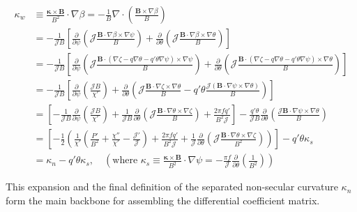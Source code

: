 \documentclass[11pt,a4paper]{article}
\begin{document}
\[ \begin{aligned} 
\kappa_w &\equiv \frac{\boldsymbol{\kappa} \times \mathbf{B}}{B^2} \cdot \nabla\beta = -\frac{1}{B} \nabla \cdot \left( \frac{\mathbf{B} \times \nabla\beta}{B} \right) \\ 
&= -\frac{1}{\mathcal{J} B} \left[ \frac{\partial}{\partial\psi} \left( \mathcal{J} \frac{\mathbf{B} \cdot \nabla\beta \times \nabla\psi}{B} \right) + \frac{\partial}{\partial\theta} \left( \mathcal{J} \frac{\mathbf{B} \cdot \nabla\beta \times \nabla\theta}{B} \right) \right] \\ 
&= -\frac{1}{\mathcal{J} B} \left[ \frac{\partial}{\partial\psi} \left( \mathcal{J} \frac{\mathbf{B} \cdot (\nabla\zeta - q\nabla\theta - q'\theta\nabla\psi) \times \nabla\psi}{B} \right) + \frac{\partial}{\partial\theta} \left( \mathcal{J} \frac{\mathbf{B} \cdot (\nabla\zeta - q\nabla\theta - q'\theta\nabla\psi) \times \nabla\theta}{B} \right) \right] \\ 
&= -\frac{1}{\mathcal{J} B} \left[ \frac{\partial}{\partial\psi} \left( \frac{\mathcal{J} B}{\chi'} \right) + \frac{\partial}{\partial\theta} \left( \mathcal{J} \frac{\mathbf{B} \cdot \nabla\zeta \times \nabla\theta}{B} - q'\theta \frac{\mathcal{J} (\mathbf{B} \cdot \nabla\psi \times \nabla\theta)}{B} \right) \right] \\ 
&= \left[-\frac{1}{\mathcal{J} B} \frac{\partial}{\partial\psi} \left( \frac{\mathcal{J} B}{\chi'} \right) + \frac{1}{\mathcal{J} B} \frac{\partial}{\partial\theta} \left( \mathcal{J} \frac{\mathbf{B} \cdot \nabla\theta \times \nabla\zeta}{B} \right) + \frac{2\pi f q'}{B^2 \mathcal{J}}\right] - \frac{q'\theta}{\mathcal{J} B} \frac{\partial}{\partial\theta} \left( \frac{\mathcal{J} \mathbf{B} \cdot \nabla\psi \times \nabla\theta}{B} \right) \\ 
&= \left[-\frac12 \left(\frac{1}{\chi'} \left( \frac{P'}{B^2} + \frac{\chi''}{\chi'} - \frac{\mathcal{J}'}{\mathcal{J}} \right) + \frac{2\pi f q'}{B^2 \mathcal{J}} + \frac{1}{\mathcal{J} } \frac{\partial}{\partial\theta} \left( \mathcal{J} \frac{\mathbf{B} \cdot \nabla\theta \times \nabla\zeta}{B^2} \right) \right)\right]- q'\theta\kappa_s \\ 
& =\kappa_n - q'\theta\kappa_s, \quad \left( \text{where } \kappa_s \equiv \frac{\boldsymbol{\kappa} \times \mathbf{B}}{B^2} \cdot \nabla\psi = -\frac{\pi f}{\mathcal{J} } \frac{\partial}{\partial\theta} \left( \frac{1}{B^2} \right) \right) 
\end{aligned} \tag{7} \]

This expansion and the final definition of the separated non-secular curvature
\(\kappa_n\) form the main backbone for assembling the differential coefficient
matrix.
\end{document}
